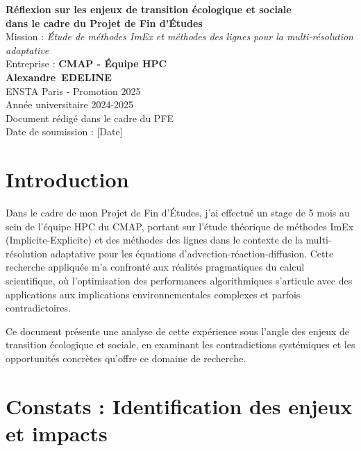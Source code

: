 \documentclass[11pt,a4paper]{article}
\newcommand{\nom}{EDELINE}
\newcommand{\prenom}{Alexandre}
\newcommand{\formation}{ENSTA Paris - Promotion 2025}
\newcommand{\annee}{2024-2025}
\newcommand{\entreprise}{CMAP - Équipe HPC}
\newcommand{\titreMission}{Étude de méthodes ImEx et méthodes des lignes pour la multi-résolution adaptative}
\begin{document}
\begin{titlepage}
    \centering
    \vspace*{2cm}
    
    {\LARGE \textbf{Réflexion sur les enjeux de transition écologique et sociale}}\\[0.5cm]
    {\Large \textbf{dans le cadre du Projet de Fin d'Études}}\\[2cm]
    
    {\large Mission : \textit{\titreMission}}\\[0.5cm]
    {\large Entreprise : \textbf{\entreprise}}\\[2cm]
    
    {\large \textbf{\prenom\ \nom}}\\[0.5cm]
    {\large \formation}\\[0.5cm]
    {\large Année universitaire \annee}\\[4cm]
    
    \vfill
    {\large Document rédigé dans le cadre du PFE}\\
    {\large Date de soumission : [Date]}
\end{titlepage}

\newpage


\section{Introduction}

Dans le cadre de mon Projet de Fin d'Études, j'ai effectué un stage de 5 mois au sein de l'équipe HPC du CMAP, portant sur l'étude théorique de méthodes ImEx (Implicite-Explicite) et des méthodes des lignes dans le contexte de la multi-résolution adaptative pour les équations d'advection-réaction-diffusion. Cette recherche appliquée m'a confronté aux réalités pragmatiques du calcul scientifique, où l'optimisation des performances algorithmiques s'articule avec des applications aux implications environnementales complexes et parfois contradictoires.

Ce document présente une analyse de cette expérience sous l'angle des enjeux de transition écologique et sociale, en examinant les contradictions systémiques et les opportunités concrètes qu'offre ce domaine de recherche.

\section{Constats : Identification des enjeux et impacts}
\end{document}
